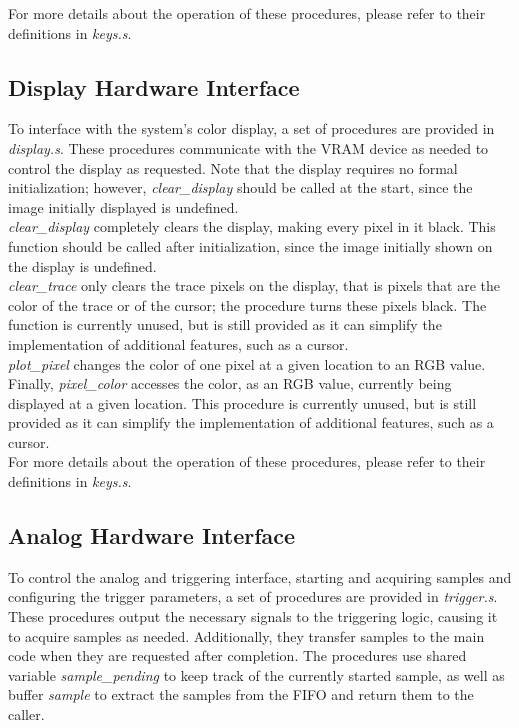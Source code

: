 \documentclass[titlepage]{scrartcl}
\begin{document}
	For more details about the operation of these procedures, please refer to their definitions in \textit{keys.s}.\\

	\subsection{Display Hardware Interface}
	To interface with the system's color display, a set of procedures are provided in \textit{display.s}. These procedures communicate with the VRAM device as needed to control the display as requested. Note that the display requires no formal initialization; however, \textit{clear\_display} should be called at the start, since the image initially displayed is undefined.\\

	\textit{clear\_display} completely clears the display, making every pixel in it black. This function should be called after initialization, since the image initially shown on the display is undefined.\\

	\textit{clear\_trace} only clears the trace pixels on the display, that is pixels that are the color of the trace or of the cursor; the procedure turns these pixels black. The function is currently unused, but is still provided as it can simplify the implementation of additional features, such as a cursor.\\

	\textit{plot\_pixel} changes the color of one pixel at a given location to an RGB value.\\

	Finally, \textit{pixel\_color} accesses the color, as an RGB value, currently being displayed at a given location. This procedure is currently unused, but is still provided as it can simplify the implementation of additional features, such as a cursor.\\

	For more details about the operation of these procedures, please refer to their definitions in \textit{keys.s}.\\

	\subsection{Analog Hardware Interface}
	To control the analog and triggering interface, starting and acquiring samples and configuring the trigger parameters, a set of procedures are provided in \textit{trigger.s}. These procedures output the necessary signals to the triggering logic, causing it to acquire samples as needed. Additionally, they transfer samples to the main code when they are requested after completion. The procedures use shared variable \textit{sample\_pending} to keep track of the currently started sample, as well as buffer \textit{sample} to extract the samples from the FIFO and return them to the caller.\\
\end{document}
